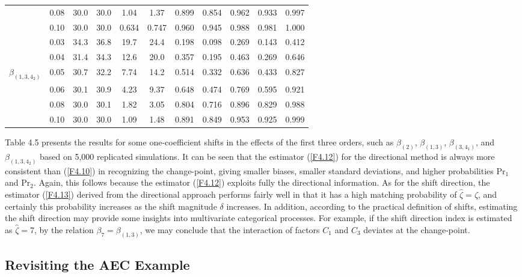 \begin{table}[htp]
\begin{tabular}{c|c|cc|cc|cc|cc|c}
& 0.08 & 30.0 & 30.0 & 1.04 & 1.37 & 0.899 & 0.854 & 0.962 & 0.933 & 0.997 \\
& 0.10 & 30.0 & 30.0 & 0.634 & 0.747 & 0.960 & 0.945 & 0.988 & 0.981 & 1.000
\\\hline
& 0.03 & 34.3 & 36.8 & 19.7 & 24.4 & 0.198 & 0.098 & 0.269 & 0.143 & 0.412 \\
& 0.04 & 31.4 & 34.3 & 12.6 & 20.0 & 0.357 & 0.195 & 0.463 & 0.269 & 0.646 \\
$\beta_{(1,3,4_2)}$ & 0.05 & 30.7 & 32.2 & 7.74 & 14.2 & 0.514 & 0.332 & 0.636 & 0.433 & 0.827 \\
& 0.06 & 30.1 & 30.9 & 4.23 & 9.37 & 0.648 & 0.474 & 0.769 & 0.595 & 0.921 \\
& 0.08 & 30.0 & 30.1 & 1.82 & 3.05 & 0.804 & 0.716 & 0.896 & 0.829 & 0.988 \\
& 0.10 & 30.0 & 30.0 & 1.09 & 1.48 & 0.891 & 0.849 & 0.953 & 0.925 & 0.999
\\\hline
\end{tabular}
\end{table}

Table 4.5 presents the results for some one-coefficient shifts in the effects of the
first three orders, such as $\beta_{(2)}$, $\beta_{(1,3)}$, $\beta_{(3,4_1)}$, and
$\beta_{(1,3,4_2)}$ based on 5,000 replicated simulations. It can be seen that the
estimator (\ref{F4.12}) for the directional method is always more consistent than
(\ref{F4.10}) in recognizing the change-point, giving smaller biases, smaller
standard deviations, and higher probabilities $\mathrm{Pr}_1$ and $\mathrm{Pr}_2$.
Again, this follows because the estimator (\ref{F4.12}) exploits fully the
directional information. As for the shift direction, the estimator (\ref{F4.13})
derived from the directional approach performs fairly well in that it has a high
matching probability of $\hat{\zeta}=\zeta$, and certainly this probability
increases as the shift magnitude $\delta$ increases. In addition, according to the
practical definition of shifts, estimating the shift direction may provide some
insights into multivariate categorical processes. For example, if the shift
direction index is estimated as $\hat{\zeta}=7$, by the relation
$\beta_7=\beta_{(1,3)}$, we may conclude that the interaction of factors $C_1$ and
$C_3$ deviates at the change-point.

\subsection{Revisiting the AEC Example}

